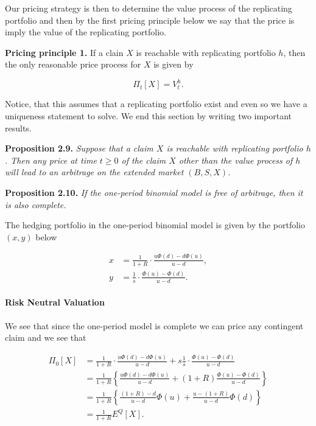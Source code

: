 \documentclass[
]{article}
\begin{document}
Our pricing strategy is then to determine the value process of the
replicating portfolio and then by the first pricing principle below we
say that the price is imply the value of the replicating portfolio.

\textbf{Pricing principle 1.} If a clain \(X\) is reachable with
replicating portfolio \(h\), then the only reasonable price process for
\(X\) is given by

\[
\Pi_t[X]=V_t^h.
\]

Notice, that this assumes that a replicating portfolio exist and even so
we have a uniqueness statement to solve. We end this section by writing
two important results.

\textbf{Proposition 2.9.} \emph{Suppose that a claim \(X\) is reachable
with replicating portfolio \(h\). Then any price at time \(t\ge 0\) of
the claim \(X\) other than the value process of \(h\) will lead to an
arbitrage on the extended market \((B,S,X)\).}

\textbf{Proposition 2.10.} \emph{If the one-period binomial model is
free of arbitrage, then it is also complete.}

The hedging portfolio in the one-period binomial model is given by the
portfolio \((x,y)\) below

\begin{align*}
x&=\frac{1}{1+R}\cdot\frac{u\Phi(d)-d\Phi(u)}{u-d},\tag{2.2}\\
y&=\frac{1}{s}\cdot\frac{\Phi(u)-\Phi(d)}{u-d}.\tag{2.3}
\end{align*}

\hypertarget{risk-neutral-valuation}{%
\paragraph{Risk Neutral Valuation}\label{risk-neutral-valuation}}

We see that since the one-period model is complete we can price any
contingent claim and we see that

\begin{align*}
\Pi_0[X]&=\frac{1}{1+R}\cdot\frac{u\Phi(d)-d\Phi(u)}{u-d}+s\frac{1}{s}\cdot\frac{\Phi(u)-\Phi(d)}{u-d}\\
&=\frac{1}{1+R}\left\{\frac{u\Phi(d)-d\Phi(u)}{u-d}+(1+R)\frac{\Phi(u)-\Phi(d)}{u-d}\right\}\\
&=\frac{1}{1+R}\left\{\frac{(1+R)-d}{u-d}\Phi(u)+\frac{u-(1+R)}{u-d}\Phi(d)\right\}\\
&=\frac{1}{1+R}E^Q[X].
\end{align*}
\end{document}
